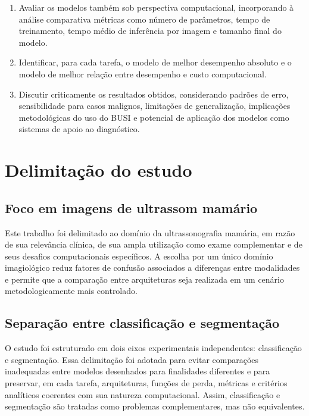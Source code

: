 \documentclass[tcc,capa]{texufpel}
\begin{document}
\begin{enumerate}
	\item Avaliar os modelos também sob perspectiva computacional, incorporando à análise comparativa métricas como número de parâmetros, tempo de treinamento, tempo médio de inferência por imagem e tamanho final do modelo.
	
	\item Identificar, para cada tarefa, o modelo de melhor desempenho absoluto e o modelo de melhor relação entre desempenho e custo computacional.
	
	\item Discutir criticamente os resultados obtidos, considerando padrões de erro, sensibilidade para casos malignos, limitações de generalização, implicações metodológicas do uso do BUSI e potencial de aplicação dos modelos como sistemas de apoio ao diagnóstico.
\end{enumerate}

\section{Delimitação do estudo}

\subsection{Foco em imagens de ultrassom mamário}

Este trabalho foi delimitado ao domínio da ultrassonografia mamária, em razão de sua relevância clínica, de sua ampla utilização como exame complementar e de seus desafios computacionais específicos. A escolha por um único domínio imagiológico reduz fatores de confusão associados a diferenças entre modalidades e permite que a comparação entre arquiteturas seja realizada em um cenário metodologicamente mais controlado.

\subsection{Separação entre classificação e segmentação}

O estudo foi estruturado em dois eixos experimentais independentes: classificação e segmentação. Essa delimitação foi adotada para evitar comparações inadequadas entre modelos desenhados para finalidades diferentes e para preservar, em cada tarefa, arquiteturas, funções de perda, métricas e critérios analíticos coerentes com sua natureza computacional. Assim, classificação e segmentação são tratadas como problemas complementares, mas não equivalentes.
\end{document}
